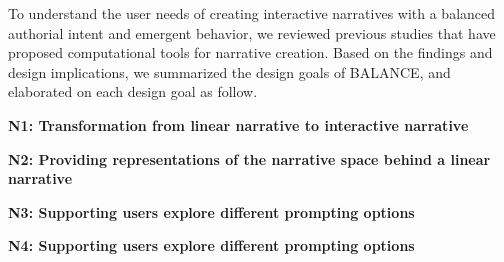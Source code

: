 To understand the user needs of creating interactive narratives with a balanced authorial intent and emergent behavior, we reviewed previous studies that have proposed computational tools for narrative creation. Based on the findings and design implications, we summarized the design goals of BALANCE, and elaborated on each design goal as follow.



\noindent \textbf{N1: Transformation from linear narrative to interactive narrative}


\noindent \textbf{N2: Providing representations of the narrative space behind a linear narrative}

\noindent \textbf{N3: Supporting users explore different prompting options}

\noindent \textbf{N4: Supporting users explore different prompting options}



\noindent \textbf{}




